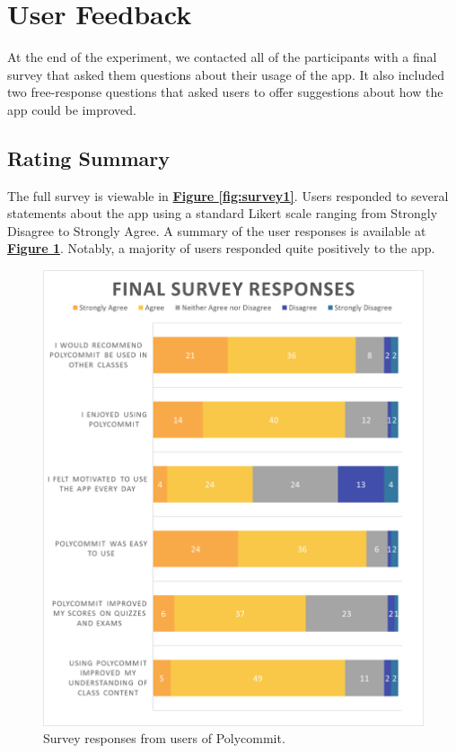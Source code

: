\section {User Feedback}

\par At the end of the experiment, we contacted all of the participants with a final survey that asked them questions about their usage of the app. It also included two free-response questions that asked users to offer suggestions about how the app could be improved.

\subsection{Rating Summary}

\par The full survey is viewable in \textbf{\hyperref[fig:survey1]{Figure \ref*{fig:survey1}}}. Users responded to several statements about the app using a standard Likert scale ranging from Strongly Disagree to Strongly Agree. A summary of the user responses is available at \textbf{\hyperref[fig:likert]{Figure \ref*{fig:likert}}}. Notably, a majority of users responded quite positively to the app.


\begin{figure}[h]
	\includegraphics[width=1.0\linewidth]{figures/likert}
	\caption{Survey responses from users of Polycommit.}
	\label{fig:likert}
\end{figure}

